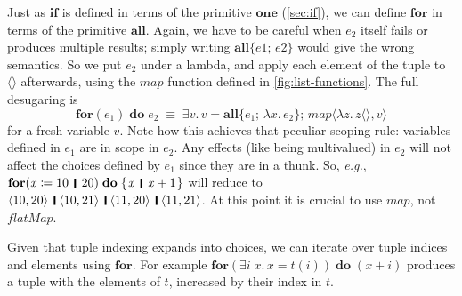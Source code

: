 \documentclass[acmsmall,review,anonymous,dvipsnames]{acmart}
\newcommand{\Varid}[1]{\mathit{#1}}
\newcommand{\eg}{\emph{e.g.}}
\begin{document}
Just as \ensuremath{\textbf{if}} is defined in terms of the primitive \ensuremath{\textbf{one}} (\cref{sec:if}), we can define \ensuremath{\textbf{for}}
in terms of the primitive \ensuremath{\textbf{all}}.
Again, we have to be careful when \ensuremath{\Varid{e}_{\mathrm{2}}} itself fails or produces multiple results;
simply writing \ensuremath{\textbf{all}\{\Varid{e1};\,\Varid{e2}\}} would give the wrong semantics. So we put \ensuremath{\Varid{e}_{\mathrm{2}}} under a lambda, and
apply each element of the tuple to \ensuremath{\langle\rangle} afterwards, using the \ensuremath{\Varid{map}} function defined in \cref{fig:list-functions}.
The full desugaring is
\[
\ensuremath{\textbf{for} (\Varid{e}_{\mathrm{1}})\;\textbf{do}\;\Varid{e}_{\mathrm{2}}} \; \equiv \; \ensuremath{\exists\Varid{v}.\,\Varid{v}=\textbf{all}\{\Varid{e}_{\mathrm{1}};\,\lambda x.\,\Varid{e}_{\mathrm{2}}\};\,\Varid{map}\langle\lambda\Varid{z}.\,\Varid{z}\langle\rangle,\Varid{v}\rangle}
\]
for a fresh variable \ensuremath{\Varid{v}}.
Note how this achieves that peculiar scoping rule: variables defined in \ensuremath{\Varid{e}_{\mathrm{1}}} are in scope in \ensuremath{\Varid{e}_{\mathrm{2}}}.
Any effects (like being multivalued) in \ensuremath{\Varid{e}_{\mathrm{2}}} will not affect the choices defined by \ensuremath{\Varid{e}_{\mathrm{1}}} since they are in a thunk.
So, {\eg}, \ensuremath{\textbf{for} (\Varid{x}\mathrel{\coloneqq}\mathrm{10}\hspace{1mm}\mathop{\rule[-0.3mm]{0.5mm}{2.5mm}}\hspace{1mm}\mathrm{20})\;\textbf{do}\;\{\mskip1.5mu \Varid{x}\hspace{1mm}\mathop{\rule[-0.3mm]{0.5mm}{2.5mm}}\hspace{1mm}\Varid{x}\mathbin{+}\mathrm{1}\mskip1.5mu\}} will reduce to
\ensuremath{\langle{}\mathrm{10},\mathrm{20}\rangle\hspace{1mm}\mathop{\rule[-0.3mm]{0.5mm}{2.5mm}}\hspace{1mm}\langle{}\mathrm{10},\mathrm{21}\rangle\hspace{1mm}\mathop{\rule[-0.3mm]{0.5mm}{2.5mm}}\hspace{1mm}\langle{}\mathrm{11},\mathrm{20}\rangle\hspace{1mm}\mathop{\rule[-0.3mm]{0.5mm}{2.5mm}}\hspace{1mm}\langle{}\mathrm{11},\mathrm{21}\rangle}.
At this point it is crucial to use \ensuremath{\Varid{map}}, not \ensuremath{\Varid{flatMap}}.

Given that tuple indexing expands into choices, we can iterate over tuple indices and elements using \ensuremath{\textbf{for}}.
For example \ensuremath{\textbf{for} (\exists\Varid{i}\;\Varid{x}.\,\Varid{x}=\Varid{t}(\Varid{i}))\;\textbf{do}\;(\Varid{x}\mathbin{+}\Varid{i})} produces a tuple with the elements of \ensuremath{\Varid{t}}, increased by their index in \ensuremath{\Varid{t}}.
\end{document}

